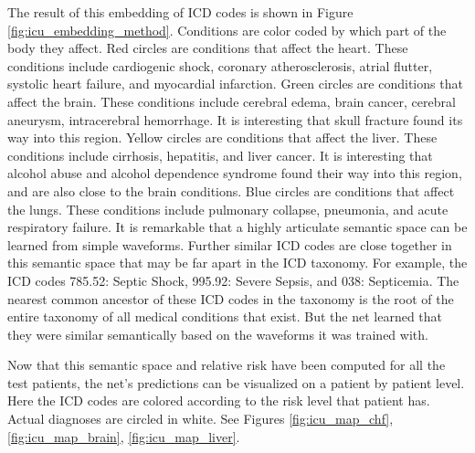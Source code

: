 The result of this embedding of ICD codes is shown in Figure \ref{fig:icu_embedding_method}. Conditions are color coded by which part of the body they affect.  Red circles are conditions that affect the heart.  These conditions include cardiogenic shock, coronary atherosclerosis, atrial flutter, systolic heart failure, and myocardial infarction.  Green circles are conditions that affect the brain.  These conditions include cerebral edema, brain cancer, cerebral aneurysm, intracerebral hemorrhage.  It is interesting that skull fracture found its way into this region.  Yellow circles are conditions that affect the liver.  These conditions include cirrhosis, hepatitis, and liver cancer.  It is interesting that alcohol abuse and alcohol dependence syndrome found their way into this region, and are also close to the brain conditions.  Blue circles are conditions that affect the lungs.  These conditions include pulmonary collapse, pneumonia, and acute respiratory failure.  It is remarkable that a highly articulate semantic space can be learned from simple waveforms.  Further similar ICD codes are close together in this semantic space that may be far apart in the ICD taxonomy.  For example, the ICD codes 785.52: Septic Shock, 995.92: Severe Sepsis, and 038: Septicemia.  The nearest common ancestor of these ICD codes in the taxonomy is the root of the entire taxonomy of all medical conditions that exist.  But the net learned that they were similar semantically based on the waveforms it was trained with.

Now that this semantic space and relative risk have been computed for all the test patients, the net's predictions can be visualized on a patient by patient level.  Here the ICD codes are colored according to the risk level that patient has.  Actual diagnoses are circled in white.  See Figures \ref{fig:icu_map_chf}, \ref{fig:icu_map_brain}, \ref{fig:icu_map_liver}.

